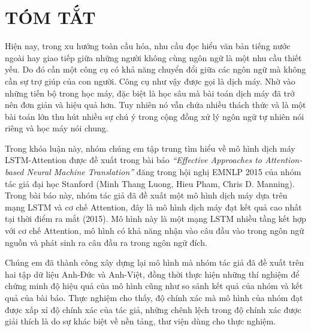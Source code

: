\newpage
\chapter*{TÓM TẮT}

 Hiện nay, trong xu hướng toàn cầu hóa, nhu cầu đọc hiểu văn bản tiếng nước ngoài hay giao tiếp giữa những người không cùng ngôn ngữ là một nhu cầu thiết yếu. Do đó cần một công cụ có khả năng chuyển đổi giữa các ngôn ngữ mà không cần sự trợ giúp của con người. Công cụ như vậy được gọi là dịch máy. Nhờ vào những tiến bộ trong học máy, đặc biệt là học sâu mà bài toán dịch máy đã trở nên đơn giản và hiệu quả hơn. Tuy nhiên nó vẫn chứa nhiều thách thức và là một bài toán lớn thu hút nhiều sự chú ý trong cộng đồng xử lý ngôn ngữ tự nhiên nói riêng và học máy nói chung.
 
 Trong khóa luận này, nhóm chúng em tập trung tìm hiểu về mô hình dịch máy LSTM-Attention được đề xuất trong bài báo\textit{ “Effective Approaches to Attention-based Neural Machine Translation”} đăng trong hội nghị EMNLP 2015 của nhóm tác giả đại học Stanford (Minh Thang Luong, Hieu Pham, Chris D. Manning). Trong bài báo này, nhóm tác giả đã đề xuất một mô hình dịch máy dựa trên mạng LSTM và cơ chế Attention, đây là mô hình dịch máy đạt kết quả cao nhất tại thời điểm ra mắt (2015). Mô hình này là một mạng LSTM nhiều tầng kết hợp với cơ chế Attention, mô hình có khả năng nhận vào câu đầu vào trong ngôn ngữ nguồn và phát sinh ra câu đầu ra trong ngôn ngữ đích. 
 
 Chúng em đã thành công xây dựng lại mô hình mà nhóm tác giả đã đề xuất trên hai tập dữ liệu Anh-Đức và Anh-Việt, đồng thời thực hiện những thí nghiệm để chứng minh độ hiệu quả của mô hình cũng như so sánh kết quả của nhóm và kết quả của bài báo. Thực nghiệm cho thấy, độ chính xác mà mô hình của nhóm đạt được xấp xỉ độ chính xác của tác giả, những chênh lệch trong độ chính xác được giải thích là do sự khác biệt về nền tảng, thư viện dùng cho thực nghiệm.
 